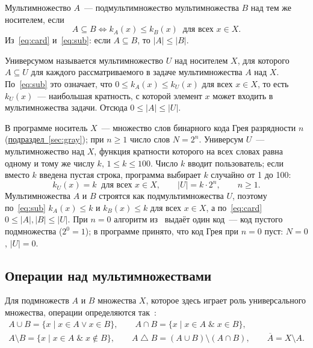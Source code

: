 \documentclass[14pt,a4paper]{extarticle}
\newcommand{\lnk}[2]{\hyperref[#1]{#2~\ref*{#1}}}
\newcommand{\kA}{k_A(x)}
\newcommand{\kB}{k_B(x)}
\newcommand{\kU}{k_U(x)}
\begin{document}
Мультимножество $A$~--- подмультимножество мультимножества $B$ над тем же носителем, если
\begin{equation}\label{eq:sub}
A \subseteq B \iff \kA \leqslant \kB \;\; \text{для всех } x \in X.
\end{equation}
Из~\eqref{eq:card} и~\eqref{eq:sub}: если $A \subseteq B$, то $|A| \leqslant |B|$.

Универсумом называется мультимножество $U$ над носителем $X$, для которого $A \subseteq U$ для каждого рассматриваемого в задаче мультимножества $A$ над $X$. По~\eqref{eq:sub} это означает, что $0 \leqslant \kA \leqslant \kU$ для всех $x \in X$, то есть $\kU$~--- наибольшая кратность, с которой элемент $x$ может входить в мультимножества задачи. Отсюда $0 \leqslant |A| \leqslant |U|$.

В программе носитель $X$~--- множество слов бинарного кода Грея разрядности $n$ (\lnk{sec:gray}{подраздел}); при $n \geqslant 1$ число слов $N = 2^n$. Универсум $U$~--- мультимножество над $X$, функция кратности которого на всех словах равна одному и тому же числу $k$, $1 \leqslant k \leqslant 100$. Число $k$ вводит пользователь; если вместо $k$ введена пустая строка, программа выбирает $k$ случайно от 1 до 100:
\begin{equation}\label{eq:univ}
\kU = k \;\; \text{для всех } x \in X, \qquad |U| = k \cdot 2^n, \qquad n \geqslant 1.
\end{equation}
Мультимножества $A$ и $B$ строятся как подмультимножества $U$, поэтому по~\eqref{eq:sub} $\kA \leqslant k$ и $\kB \leqslant k$ для всех $x \in X$, а по~\eqref{eq:card} $0 \leqslant |A|, |B| \leqslant |U|$. При $n = 0$ алгоритм из~\cite{novikov} выдаёт один код~--- код пустого подмножества ($2^0 = 1$); в программе принято, что код Грея при $n = 0$ пуст: $N = 0$, $|U| = 0$.

\subsection{Операции над мультимножествами}\label{sec:ops}

Для подмножеств $A$ и $B$ множества $X$, которое здесь играет роль универсального множества, операции определяются так~\cite{novikov}:
\begin{gather*}
A \cup B = \{x \mid x \in A \lor x \in B\}, \qquad A \cap B = \{x \mid x \in A \;\&\; x \in B\}, \\
A \setminus B = \{x \mid x \in A \;\&\; x \notin B\}, \qquad A \mathbin{\triangle} B = (A \cup B) \setminus (A \cap B), \qquad \overline{A} = X \setminus A .
\end{gather*}
\end{document}

